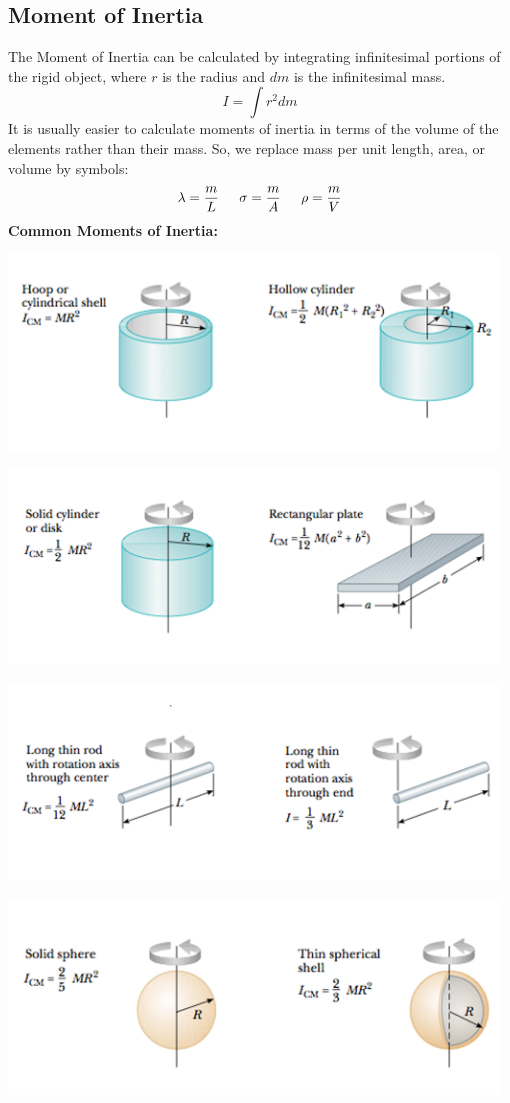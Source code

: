 \documentclass{article}
\begin{document}
	\subsection{Moment of Inertia}
    	The Moment of Inertia can be calculated by integrating infinitesimal portions of the rigid object, where $r$ is the radius and $dm$ is the infinitesimal mass.
        \[
        	I=\int r^2 dm
        \]
        It is usually easier to calculate moments of inertia in terms of the volume of the elements rather than their mass. So, we replace mass per unit length, area, or volume by symbols:
        \[
        	\lambda=\frac{m}{L} \indent
            \sigma=\frac{m}{A} \indent
            \rho=\frac{m}{V}
        \]
        \textbf{Common Moments of Inertia:}\\
        \centerline{\includegraphics[width=13cm]{cmi1.png}}
        \centerline{\includegraphics[width=13cm]{cmi2.png}}
        \centerline{\includegraphics[width=13cm]{cmi3.png}}
        \centerline{\includegraphics[width=13cm]{cmi4.png}}
\end{document}
